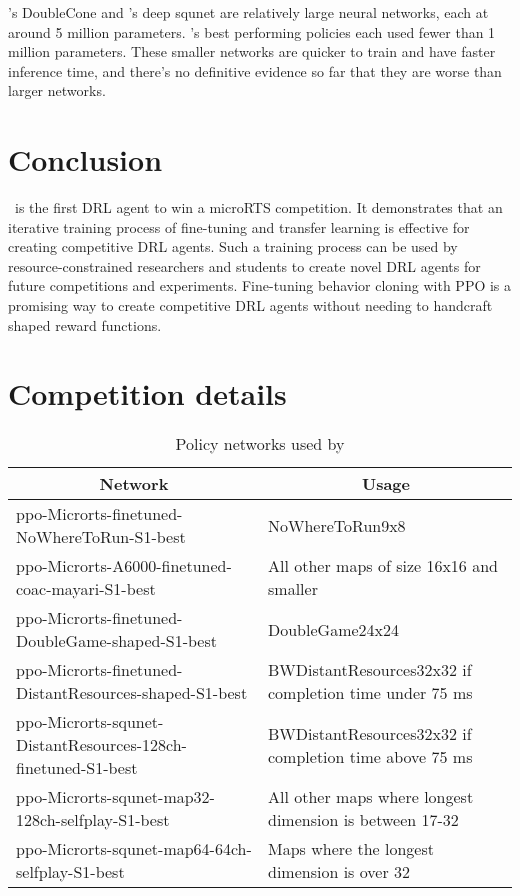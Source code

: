 \documentclass[conference]{IEEEtran}
\begin{document}
\agentName's DoubleCone and \bcPPOAgent's deep squnet are relatively large neural
networks, each at around 5 million parameters.
\cite{DBLP:journals/corr/abs-2105-13807}'s best performing policies each used fewer
than 1 million parameters. These smaller networks are quicker to train and have faster
inference time, and there's no definitive evidence so far that they are worse than
larger networks.

\section{Conclusion}
\agentName\ is the first DRL agent to win a microRTS competition. It demonstrates that
an iterative training process of fine-tuning and transfer learning is effective for
creating competitive DRL agents. Such a training process can be used by
resource-constrained researchers and students to create novel DRL agents for future
competitions and experiments. Fine-tuning behavior cloning with PPO is a promising way
to create competitive DRL agents without needing to handcraft shaped reward functions.




\appendices
\section{Competition details}
\begin{table}[t]
    \caption{Policy networks used by \agentName}
    \label{tab:policy-networks}
    \begin{center}
        \begin{tabular}{p{0.5\linewidth}p{0.5\linewidth}}
            \multicolumn{1}{c}{\bf Network}  &\multicolumn{1}{c}{\bf Usage} \\
            \midrule
            ppo-Microrts-finetuned-NoWhereToRun-S1-best & NoWhereToRun9x8 \\ \hline
            ppo-Microrts-A6000-finetuned-coac-mayari-S1-best & All other maps of size 16x16 and smaller \\ \hline
            ppo-Microrts-finetuned-DoubleGame-shaped-S1-best & DoubleGame24x24 \\ \hline
            ppo-Microrts-finetuned-DistantResources-shaped-S1-best & BWDistantResources32x32 if completion time under 75 ms \\ \hline
            ppo-Microrts-squnet-DistantResources-128ch-finetuned-S1-best & BWDistantResources32x32 if completion time above 75 ms \\ \hline
            ppo-Microrts-squnet-map32-128ch-selfplay-S1-best & All other maps where longest dimension is between 17-32 \\ \hline
            ppo-Microrts-squnet-map64-64ch-selfplay-S1-best & Maps where the longest
            dimension is over 32 \\
        \end{tabular}
    \end{center}
\end{table}
\end{document}
